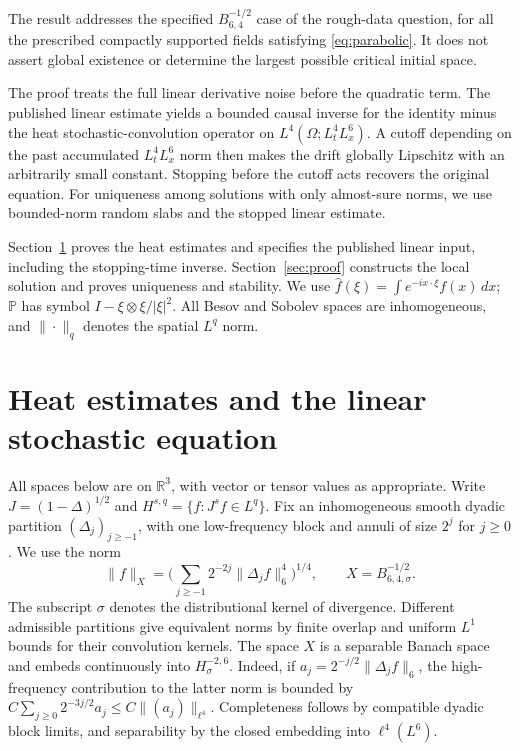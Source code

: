 \documentclass[11pt]{article}
\newcommand{\R}{\mathbb R}
\newcommand{\Pp}{\mathbb P}
\numberwithin{equation}{section}
\begin{document}
The result addresses the specified $B^{-1/2}_{6,4}$ case of the rough-data
question, for all the prescribed compactly supported fields satisfying
\eqref{eq:parabolic}. It does not assert global existence or determine the
largest possible critical initial space.

The proof treats the full linear derivative noise before the quadratic
term. The published linear estimate yields a bounded causal inverse for
the identity minus the heat stochastic-convolution operator on
$L^4(\Omega;L^4_tL^6_x)$. A cutoff depending on the past accumulated
$L^4_tL^6_x$ norm then makes the drift globally Lipschitz with an arbitrarily
small constant. Stopping before the cutoff acts recovers the original
equation. For uniqueness among solutions with only almost-sure norms,
we use bounded-norm random slabs and the stopped linear estimate.

Section~\ref{sec:estimates} proves the heat estimates and specifies the
published linear input, including the stopping-time inverse.
Section~\ref{sec:proof} constructs the local solution and proves uniqueness
and stability. We use $\widehat f(\xi)=\int e^{-ix\cdot\xi}f(x)\,dx$;
$\Pp$ has symbol $I-\xi\otimes\xi/|\xi|^2$. All Besov and Sobolev spaces
are inhomogeneous, and $\|\cdot\|_q$ denotes the spatial $L^q$ norm.
\section{Heat estimates and the linear stochastic equation}\label{sec:estimates}

All spaces below are on $\R^3$, with vector or tensor values as appropriate.
Write $J=(1-\Delta)^{1/2}$ and
$H^{s,q}=\{f:J^sf\in L^q\}$. Fix an inhomogeneous smooth dyadic
partition $(\Delta_j)_{j\geq-1}$, with one low-frequency block and annuli
of size $2^j$ for $j\geq0$. We use the norm
\begin{equation}\label{eq:Xnorm}
 \|f\|_X=\Big(\sum_{j\geq-1}2^{-2j}\|\Delta_jf\|_6^4\Big)^{1/4},
 \qquad X=B^{-1/2}_{6,4,\sigma}.
\end{equation}
The subscript $\sigma$ denotes the distributional kernel of divergence.
Different admissible partitions give equivalent norms by finite overlap and
uniform $L^1$ bounds for their convolution kernels. The space $X$ is a
separable Banach space and embeds continuously into $H^{-2,6}_\sigma$.
Indeed, if $a_j=2^{-j/2}\|\Delta_jf\|_6$, the high-frequency contribution
to the latter norm is bounded by
$C\sum_{j\geq0}2^{-3j/2}a_j\leq C\|(a_j)\|_{\ell^4}$.
Completeness follows by compatible dyadic block limits, and separability by
the closed embedding into $\ell^4(L^6)$.
\end{document}
